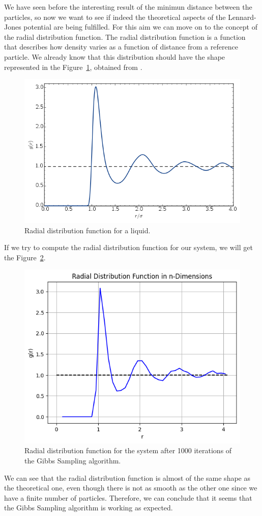\documentclass{report}
\begin{document}
We have seen before the interesting result of the minimun distance between the particles, so now we want to see if indeed the theoretical aspects of the Lennard-Jones potential are being fulfilled. For this aim we can move on to the concept of the radial distribution function. The radial distribution function is a function that describes how density varies as a function of distance from a reference particle. We already know that this distribution should have the shape represented in the Figure~\ref{fig:radialdistributionfunction}, obtained from \cite{wiki:radialdistributionfunction}.

\begin{figure}[H]
	\centering
	\includegraphics[width=0.5\linewidth]{./Figures/MCMC/LennardJones/radialdistributionfunction.png}
	\caption{Radial distribution function for a liquid.}
	\label{fig:radialdistributionfunction}
\end{figure}

If we try to compute the radial distribution function for our system, we will get the Figure~\ref{fig:radialdistributionfunctionmh}.

\begin{figure}[H]
	\centering
	\includegraphics[width=0.52\linewidth]{./Figures/MCMC/LennardJones/rdf_exp.png}
	\caption{Radial distribution function for the system after 1000 iterations of the Gibbs Sampling algorithm.}
	\label{fig:radialdistributionfunctionmh}
\end{figure}

We can see that the radial distribution function is almost of the same shape as the theoretical one, even though there is not as smooth as the other one since we have a finite number of particles. Therefore, we can conclude that it seems that the Gibbs Sampling algorithm is working as expected.

\newpage



\end{document}
